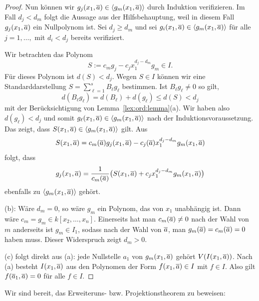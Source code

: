 \documentclass[11pt]{article}
\numberwithin{equation}{section}
\begin{document}
\begin{proof}
	
	Nun können wir $g_j(x_1,\overline{a}) \in \left< g_m(x_1,\overline{a}) \right>$ durch Induktion verifizieren. Im Fall $d_j < d_m$ folgt die Aussage aus der Hilfsbehauptung, weil in diesem Fall $g_j(x_1,\overline{a})$ ein Nullpolynom ist. Sei $d_j \ge d_m$ und sei $g_i(x_1,\overline{a}) \in \left< g_m(x_1,\overline{a}) \right>$ für alle $j =1,\ldots,$ mit $d_i < d_j$ bereits verifiziert. 
	
	Wir betrachten das Polynom 
	\[
		S := c_m g_j - c_j x_1^{d_j- d_m} g_m \in I. 
	\]
	Für dieses Polynom ist $d(S) < d_j$. Wegen $S \in I$ können wir eine Standarddarstellung $S = \sum_{\ell=1}^s B_\ell g_\ell$ bestimmen. Ist $B_\ell g_\ell \ne 0$ so gilt, 
	\[
		d(B_\ell g_\ell) = d(B_\ell) + d(g_\ell) \le d(S) < d_j
	\]
	mit der Berücksichtigung von Lemma~\ref{lex:ord:lemma}(a).  Wir haben also $d(g_\ell) < d_j$ und somit $g_\ell (x_1,\overline{a}) \in \left< g_m(x_1,\overline{a}) \right>$ nach der Induktionsvoraussetzung. Das zeigt, dass $S(x_1,\overline{a}) \in \left<  g_m(x_1,\overline{a}) \right>$ gilt. Aus
	\[
		S(x_1,\overline{a}) = c_m(\overline{a}) g_j(x_1,\overline{a}) - c_j(\overline{a}) x_1^{d_j-d_m} g_m(x_1,\overline{a})
	\]
	folgt, dass 
	\[
		 g_j(x_1,\overline{a}) = \frac{1}{c_m(\overline{a})} \bigl( S(x_1,\overline{a}) + c_j x_1^{d_j-d_m} g_m(x_1,\overline{a}) \bigr) 
	\]
	ebenfalls zu $\left< g_m(x_1,\overline{a}) \right>$ gehört. 
	

(b): Wäre $d_m =0$, so wäre $g_m$ ein Polynom, das von $x_1$ unabhängig ist. Dann wäre $c_m = g_m \in k[x_2,\ldots,x_n]$. Einerseits hat man  $c_m(\overline{a}) \ne 0$ nach der Wahl von $m$ anderseits ist $g_m \in I_1$, sodass nach der Wahl von $\overline{a}$, man $g_m(\overline{a}) = c_m(\overline{a}) = 0$ haben muss. Dieser Widerspruch zeigt $d_m >0$. 

(c) folgt direkt aus (a): jede Nullstelle  $a_1$ von $g_m(x_1,\overline{a})$ gehört $V(I(x_1,\overline{a}))$. Nach (a) besteht $I(x_1,\overline{a})$ aus den Polynomen der Form $f(x_1,\overline{a}) \in I$ mit $f \in I$. Also gilt $f(\overline{a}_1,\overline{a}) =0$ für alle $f \in I$. 
\end{proof} 

Wir sind bereit, das Erweiteruns- bzw. Projektionstheorem zu beweisen: 
\end{document}
